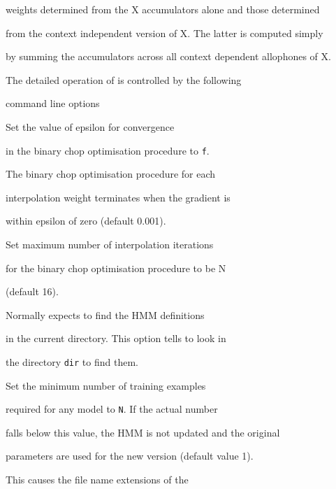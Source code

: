 weights determined from the X accumulators alone and those determined


from the context independent version of X.  The latter is computed simply


by summing the accumulators across all context dependent allophones of X.





The detailed operation of  is controlled by the following


command line options


\begin{optlist}


    Set the value of epsilon for convergence 


      in the binary chop  optimisation procedure to {\tt f}.


       The binary chop  optimisation procedure for each


       interpolation weight terminates when the gradient is


       within epsilon of zero (default 0.001).


  


    Set maximum number of interpolation iterations


       for the binary chop  optimisation procedure to be N


       (default 16).





 Normally  expects to find the HMM definitions


      in the current directory.  This option tells  to look in


      the directory {\tt dir} to find them.








     Set the minimum number of training examples 


    required for any model to {\tt N}.  If the actual number


    falls below this value, the HMM is not updated and the original


    parameters are used for the new version (default value 1).





    This causes the file name extensions of the



\end{optlist}
